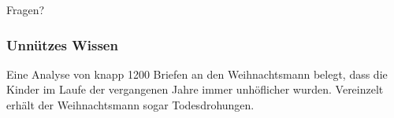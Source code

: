 \documentclass{beamer}
\begin{document}
\begin{frame}
	\begin{center}
		Fragen?
	\end{center}
\end{frame}

\begin{frame}
	\frametitle{Unnützes Wissen}
	\begin{center}
		Eine Analyse von knapp 1200 Briefen an den Weihnachtsmann belegt, dass die Kinder im Laufe der vergangenen Jahre immer unhöflicher wurden. Vereinzelt erhält der Weihnachtsmann sogar Todesdrohungen.
	\end{center}
\end{frame}
\end{document}
